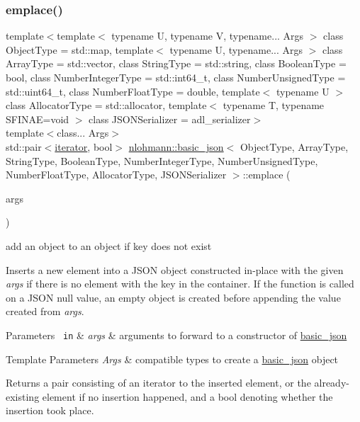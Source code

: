 \subsubsection{\texorpdfstring{emplace()}{emplace()}}
{\footnotesize\ttfamily template$<$template$<$ typename U, typename V, typename... Args $>$ class Object\+Type = std\+::map, template$<$ typename U, typename... Args $>$ class Array\+Type = std\+::vector, class String\+Type  = std\+::string, class Boolean\+Type  = bool, class Number\+Integer\+Type  = std\+::int64\+\_\+t, class Number\+Unsigned\+Type  = std\+::uint64\+\_\+t, class Number\+Float\+Type  = double, template$<$ typename U $>$ class Allocator\+Type = std\+::allocator, template$<$ typename T, typename S\+F\+I\+N\+A\+E=void $>$ class J\+S\+O\+N\+Serializer = adl\+\_\+serializer$>$ \\
template$<$class... Args$>$ \\
std\+::pair$<$\mbox{\hyperlink{classnlohmann_1_1basic__json_a099316232c76c034030a38faa6e34dca}{iterator}}, bool$>$ \mbox{\hyperlink{classnlohmann_1_1basic__json}{nlohmann\+::basic\+\_\+json}}$<$ Object\+Type, Array\+Type, String\+Type, Boolean\+Type, Number\+Integer\+Type, Number\+Unsigned\+Type, Number\+Float\+Type, Allocator\+Type, J\+S\+O\+N\+Serializer $>$\+::emplace (\begin{DoxyParamCaption}\item[{Args \&\&...}]{args }\end{DoxyParamCaption})\hspace{0.3cm}{\ttfamily [inline]}}



add an object to an object if key does not exist 

Inserts a new element into a J\+S\+ON object constructed in-\/place with the given {\itshape args} if there is no element with the key in the container. If the function is called on a J\+S\+ON null value, an empty object is created before appending the value created from {\itshape args}.


\begin{DoxyParams}[1]{Parameters}
\mbox{\texttt{ in}}  & {\em args} & arguments to forward to a constructor of \mbox{\hyperlink{classnlohmann_1_1basic__json}{basic\+\_\+json}} \\
\hline
\end{DoxyParams}

\begin{DoxyTemplParams}{Template Parameters}
{\em Args} & compatible types to create a \mbox{\hyperlink{classnlohmann_1_1basic__json}{basic\+\_\+json}} object\\
\hline
\end{DoxyTemplParams}
\begin{DoxyReturn}{Returns}
a pair consisting of an iterator to the inserted element, or the already-\/existing element if no insertion happened, and a bool denoting whether the insertion took place.
\end{DoxyReturn}

